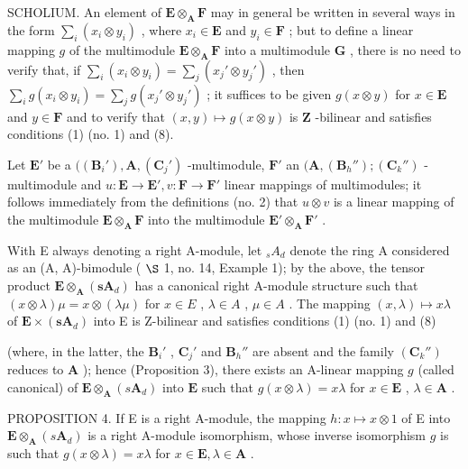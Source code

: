SCHOLIUM. An element of \(\mathbf{E} \otimes_{\mathbf{A}} \mathbf{F}\) may in general be written in several ways in the form \(\sum_{i} (x_i \otimes y_i)\) , where \(x_i \in \mathbf{E}\) and \(y_i \in \mathbf{F}\) ; but to define a linear mapping \(g\) of the multimodule \(\mathbf{E} \otimes_{\mathbf{A}} \mathbf{F}\) into a multimodule \(\mathbf{G}\) , there is no need to verify that, if \(\sum_{i} (x_i \otimes y_i) = \sum_{j} (x_j' \otimes y_j')\) , then \(\sum_{i} g(x_i \otimes y_i) = \sum_{j} g(x_j' \otimes y_j')\) ; it suffices to be given \(g(x \otimes y)\) for \(x \in \mathbf{E}\) and \(y \in \mathbf{F}\) and to verify that \((x, y) \mapsto g(x \otimes y)\) is \(\mathbf{Z}\) -bilinear and satisfies conditions (1) (no. 1) and (8).

Let \(\mathbf{E}'\) be a \(((\mathbf{B}_i'),\mathbf{A},(\mathbf{C}_j')\) -multimodule, \(\mathbf{F}'\) an \((\mathbf{A},(\mathbf{B}_h'');(\mathbf{C}_k'')\) -multimodule and \(u:\mathbf{E}\to \mathbf{E}',v:\mathbf{F}\to \mathbf{F}'\) linear mappings of multimodules; it follows immediately from the definitions (no. 2) that \(u\otimes v\) is a linear mapping of the multimodule \(\mathbf{E}\otimes_{\mathbf{A}}\mathbf{F}\) into the multimodule \(\mathbf{E}'\otimes_{\mathbf{A}}\mathbf{F}'\) .

With E always denoting a right A-module, let \(_{s}A_{d}\) denote the ring A considered as an (A, A)-bimodule ( \(\S\) 1, no. 14, Example 1); by the above, the tensor product \(\mathbf{E} \otimes_{\mathbf{A}} (\mathbf{s}\mathbf{A}_{d})\) has a canonical right A-module structure such that \((x \otimes \lambda)\mu = x \otimes (\lambda\mu)\) for \(x \in E\) , \(\lambda \in A\) , \(\mu \in A\) . The mapping \((x, \lambda) \mapsto x\lambda\) of \(\mathbf{E} \times (\mathbf{s}\mathbf{A}_{d})\) into E is Z-bilinear and satisfies conditions (1) (no. 1) and (8)

(where, in the latter, the \(\mathbf{B}_i'\) , \(\mathbf{C}_j'\) and \(\mathbf{B}_h''\) are absent and the family \((\mathbf{C}_k'')\) reduces to \(\mathbf{A}\) ); hence (Proposition 3), there exists an A-linear mapping \(g\) (called canonical) of \(\mathbf{E} \otimes_{\mathbf{A}} (s\mathbf{A}_d)\) into \(\mathbf{E}\) such that \(g(x \otimes \lambda) = x\lambda\) for \(x \in \mathbf{E}\) , \(\lambda \in \mathbf{A}\) .

PROPOSITION 4. If E is a right A-module, the mapping \(h: x \mapsto x \otimes 1\) of E into \(\mathbf{E} \otimes_{\mathbf{A}} (s\mathbf{A}_d)\) is a right A-module isomorphism, whose inverse isomorphism \(g\) is such that \(g(x \otimes \lambda) = x\lambda\) for \(x \in \mathbf{E}, \lambda \in \mathbf{A}\) .

